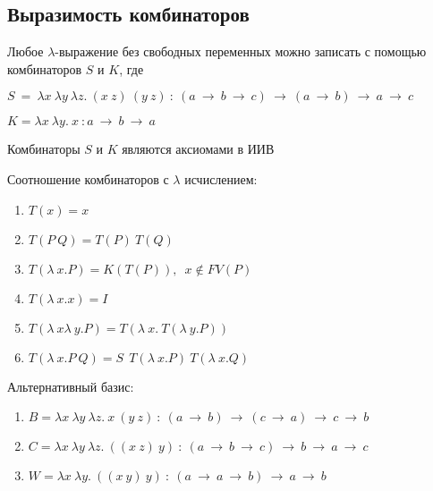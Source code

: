 	 \subsection{Выразимость комбинаторов}
	 \begin{statement}Любое $\lambda$-выражение без свободных переменных можно записать с помощью комбинаторов $S$ и $K$, где\end{statement}
	 $S\:=\:\lambda x\:\lambda y\:\lambda z.\:(x\:z)\:(y\:z)\: : \:(a\:\rightarrow\:b\:\rightarrow\:c)\:\rightarrow\:(a\:\rightarrow\:b)\:\rightarrow\:a\:\rightarrow\:c$\par 
	 $K=\lambda x\:\lambda y.\:x\: : a\:\rightarrow\:b\:\rightarrow\:a$\par 
	 \begin{statement}Комбинаторы $S$ и $K$ являются аксиомами в ИИВ\end{statement}
	\begin{statement}Соотношение комбинаторов с $\lambda$ исчислением:\end{statement}
	\begin{enumerate}
		\item $T(x)=x$
		\item $T(P\:Q)=T(P)\:T(Q)$
		\item $T(\lambda\:x.P)=K(T(P)),\enspace x\not\in FV(P)$
		\item $T(\lambda\:x.x)=I$
		\item $T(\lambda\:x\lambda\:y.P)=T(\lambda\:x.\:T(\lambda\:y.P))$
		\item $T(\lambda\:x.P\:Q)=S\:\:T(\lambda\:x.P)\:T(\lambda\:x.Q)$
	\end{enumerate}
	\begin{statement}Альтернативный базис:\end{statement}
	 \begin{enumerate}
		\item $B=\lambda x\:\lambda y\:\lambda z.\:x\:(y\:z)\: : \:(a\:\rightarrow\:b)\:\rightarrow\:(c\:\rightarrow\:a)\:\rightarrow\:c\:\rightarrow\:b$
		\item $C=\lambda x\:\lambda y\:\lambda z.\:((x\:z)\:y)\: : \:(a\:\rightarrow\:b\:\rightarrow\:c)\:\rightarrow\:b\:\rightarrow\:a\:\rightarrow\:c$
		\item $W=\lambda x\:\lambda y.\:((x\:y)\:y)\: : \: (a\:\rightarrow\:a\:\rightarrow\:b)\:\rightarrow\:a\:\rightarrow\:b$
		\\\\\\
	 \end{enumerate}
